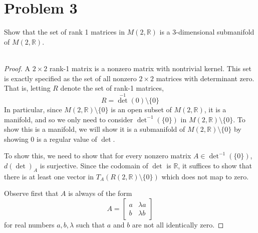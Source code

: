 \documentclass[fontsize=11pt]{scrartcl} %
\numberwithin{equation}{section} %
\numberwithin{figure}{section} %
\numberwithin{table}{section} %
\newcommand{\R}{\mathbb{R}}
\begin{document}
\newpage

\section*{Problem 3}
Show that the set of rank 1 matrices in $M(2,\R)$ is a 3-dimensional submanifold
of $M(2,\R)$.
\\
\\
\begin{proof}
    A $2\times 2$ rank-1 matrix is a nonzero matrix with nontrivial kernel. This
    set is exactly specified as the set of all nonzero $2\times 2$ matrices with
    determinant zero. That is, letting $R$ denote the set of rank-1 matrices,
    \[
        R = {\det}^{-1}(0)\setminus \{0\}
    \]
    In particular, since $M(2,\R)\setminus\{0\}$ is an open subset of $M(2,\R)$,
    it is a manifold, and so we only need to consider ${\det}^{-1}(\{0\})$ in
    $M(2,\R)\setminus\{0\}$. To show this is a manifold, we will show it is a
    submanifold of $M(2,\R)\setminus\{0\}$ by showing $0$ is a regular value of
    $\det$.

    To show this, we need to show that for every nonzero matrix
    $A\in{\det}^{-1}(\{0\})$, $d(\det)_A$ is surjective. Since the codomain of
    $\det$ is $\R$, it suffices to show that there is at least one vector in
    $T_A(R(2,\R)\setminus\{0\})$ which does not map to zero.

    Observe first that $A$ is always of the form
    \[
        A =
        \begin{bmatrix}
            a &\lambda a\\
            b &\lambda b
        \end{bmatrix}
    \]
    for real numbers $a,b,\lambda$ such that $a$ and $b$ are not all identically
    zero.


\end{proof}
\end{document}
